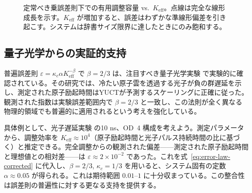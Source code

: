 \documentclass[12pt,a4paper]{article}
\theoremstyle{definition}
\theoremstyle{remark}
\newcommand{\Keff}{K_{\mathrm{eff}}}
\begin{document}
	\begin{figure}[htbp]
		\centering
		\caption{定常べき乗誤差則下での有用調整容量 vs.\ \(K_{\mathrm{eff}}\)。点線は完全な線形成長を示す。$K_{\mathrm{eff}}$ が増加すると、誤差はわずかな準線形偏差を引き起こす。システムは辞書サイズ限界に達したときにのみ飽和する。}
		\label{fig:keff-phase}
	\end{figure}
	
	\subsection{量子光学からの実証的支持}
	普遍誤差則 $\varepsilon = \kappa_c \alpha K_{\mathrm{eff}}^{-\beta}$ で $\beta = 2/3$ は、注目すべき量子光学実験 \cite{AppendixS} で実験的に確認されている。その研究では、冷たい原子雲を透過する光子が負の群遅延を示し、測定された原子励起時間はYUCTが予測するスケーリングに正確に従った。観測された指数は実験誤差範囲内で $\beta = 2/3$ と一致し、この法則が全く異なる物理的領域でも普遍的に適用されるという考えを強化している。
	
	具体例として、光子遅延実験 \cite{AppendixS} の10 ns、OD~4 構成を考えよう。測定パラメータから、調整効率を $\Keff \approx 10^4$（原子励起時間と光子パルス持続時間の比に基づく）と推定できる。完全調整からの観測された偏差——測定された原子励起時間と理想値との相対差——は $\varepsilon \approx 2\times10^{-2}$ であった。これを式~\eqref{eq:error-law-corrected} に代入し、$\beta=2/3$, $\kappa_c=1/3$ を用いると、システム固有の定数 $\alpha \approx 0.05$ が得られる。これは期待範囲 $0.01$–$1$ に十分収まっている。この整合性は誤差則の普遍性に対する更なる支持を提供する。
	
\end{document}
